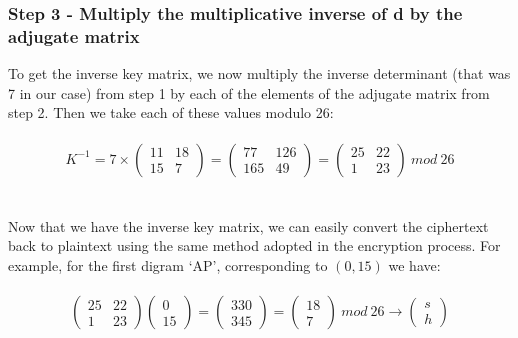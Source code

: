 \documentclass[Lau,binding=0.6cm,oneside]{sapthesis}
\begin{document}
\subsubsection{Step 3 - Multiply the multiplicative inverse of d by the adjugate matrix}
To get the inverse key matrix, we now multiply the inverse determinant (that was 7 in our case) from step 1 by each of the elements of the adjugate matrix from step 2. Then we take each of these values modulo 26:\\\\
\begin{equation}
K^{-1} = 7 \times \begin{pmatrix} 11 & 18 \\ 15 & 7 \end{pmatrix} =
\begin{pmatrix} 77 & 126 \\ 165 & 49 \end{pmatrix} = \begin{pmatrix} 25 & 22 \\ 1 & 23 \end{pmatrix} \ mod \ 26
\end{equation}
\ \\\\
Now that we have the inverse key matrix, we can easily convert the ciphertext back to plaintext using the same method adopted in the encryption process. For example, for the first digram `AP', corresponding to $(0, 15)$ we have:\\\\
\begin{equation}
\begin{pmatrix} 25 & 22 \\ 1 & 23 \end{pmatrix} \begin{pmatrix} 0 \\ 15 \end{pmatrix} = 
\begin{pmatrix} 330 \\ 345 \end{pmatrix} = \begin{pmatrix} 18 \\ 7 \end{pmatrix} \ mod \ 26 \rightarrow \begin{pmatrix} s \\ h \end{pmatrix}
\end{equation}
\ \\\\
\end{document}
